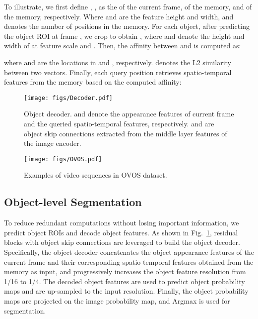 \documentclass[journal]{IEEEtran}
\begin{document}
To illustrate, we first define , ,  as the  of the current frame,  of the memory, and  of the memory, respectively. Where  and  are the feature height and width, and  denotes the number of positions in the memory. For each object, after predicting the object ROI  at frame , we crop  to obtain   , where  and  denote the height and width of  at feature scale and . Then, the affinity between  and  is computed as:

where  and  are the locations in  and , respectively.  denotes the L2 similarity between two vectors. Finally, each query position retrieves spatio-temporal features from the memory based on the computed affinity:





\begin{figure}[t]
\centering
\texttt{[image: figs/Decoder.pdf]}
\caption{Object decoder.  and  denote the appearance features of current frame and the queried spatio-temporal features, respectively.  and  are object skip connections extracted from the middle layer features of the image encoder.} 
\label{fig:decoder}
\end{figure}

\begin{figure*}[t]
\centering
\texttt{[image: figs/OVOS.pdf]}
\caption{Examples of video sequences in OVOS dataset.} 
\label{fig:ovos}
\end{figure*}

\subsection{Object-level Segmentation}
To reduce redundant computations without losing important information, we predict object ROIs and decode object features. As shown in Fig.~\ref{fig:decoder}, residual blocks with object skip connections are leveraged to build the object decoder. Specifically, the object decoder concatenates the object appearance features of the current frame  and their corresponding spatio-temporal features  obtained from the memory as input, and progressively increases the object feature resolution from 1/16 to 1/4. The decoded object features are used to predict object probability maps and are up-sampled to the input resolution. Finally, the object probability maps are projected on the image probability map, and Argmax is used for segmentation.
\end{document}
